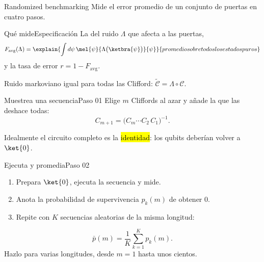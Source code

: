 \documentclass[12pt]{beamer}
\begin{document}
  {Randomized benchmarking}
  {Mide el error promedio de un conjunto de puertas en cuatro pasos.}

\begin{frame}{Qué mide}{Especificación}
La  del ruido $\Lambda$ que afecta a las puertas,
\[
  F_{\mathrm{avg}}(\Lambda)
  = \explain{\int d\psi\,\mel{\psi}{\Lambda\big(\ketbra{\psi}\big)}{\psi}}{promedio sobre todos los estados puros}
\]
y la tasa de error $r = 1 - F_{\mathrm{avg}}$.
\begin{notebox}[Supone]
Ruido markoviano igual para todas las Clifford:
$\tilde{\mathcal{C}} = \Lambda\circ\mathcal{C}$.
\end{notebox}
\end{frame}

\begin{frame}{Muestrea una secuencia}{Paso 01}
Elige $m$ Cliffords al azar y añade la que las deshace todas:
\[
  C_{m+1} = \big(C_m \cdots C_2\, C_1\big)^{-1}.
\]
\begin{center}
\end{center}
Idealmente el circuito completo es la \hl{identidad}: los qubits deberían
volver a $\ket{0}$.
\end{frame}

\begin{frame}{Ejecuta y promedia}{Paso 02}
\begin{enumerate}
  \item Prepara $\ket{0}$, ejecuta la secuencia y mide.
  \item Anota la probabilidad de supervivencia $p_k(m)$ de obtener $0$.
  \item Repite con $K$ secuencias aleatorias de la misma longitud:
\end{enumerate}
\[
  \bar p(m) = \frac{1}{K}\sum_{k=1}^{K} p_k(m).
\]
Hazlo para varias longitudes, desde $m = 1$ hasta unos cientos.
\end{frame}
\end{document}
